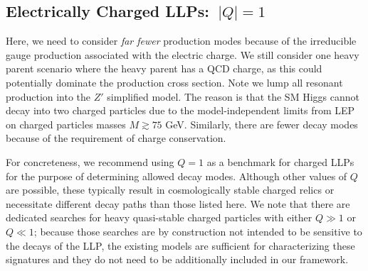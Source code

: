 \subsection{Electrically Charged LLPs:~$|Q|=1$}

Here, we need to consider \emph{far fewer} production modes because of the irreducible gauge production associated with the electric charge. We still consider one heavy parent scenario where the heavy parent has a QCD charge, as this could potentially dominate the production cross section. Note we lump all resonant production into the $Z'$ simplified model.  The reason is that the SM Higgs cannot decay into two charged particles due to the model-independent limits from LEP on charged particles masses $M\gtrsim75$ GeV.   Similarly, there are fewer decay modes because of the requirement of charge conservation.  %

For concreteness, we recommend using $Q=1$ as a benchmark for charged LLPs for the purpose of determining allowed decay modes. 
Although other values of $Q$ are possible, these typically result in cosmologically stable charged relics or necessitate different decay paths than those listed here.   
We note that there are dedicated searches for heavy quasi-stable charged particles with either $Q\gg1$ or $Q\ll1$; because those searches are by construction not intended to be sensitive to the decays of the LLP, the existing models are sufficient for characterizing these signatures and they do not need to be additionally included in our framework.


